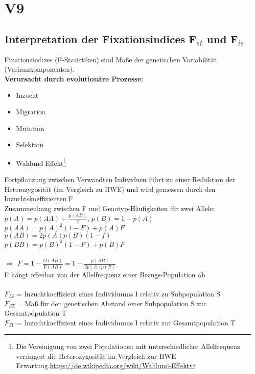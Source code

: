 \section{V9}
\subsection{Interpretation der Fixationsindices F$_{st}$ und F$_{is}$}
Fixationsindizes (F-Statistiken) sind Maße der genetischen Variabilität (Varianzkomponenten).\\

\textbf{Verursacht durch evolutionäre Prozesse:}
\begin{itemize}
	\item Inzucht
	\item Migration
	\item Mutation
	\item Selektion
	\item Wahlund Effekt\footnote{Die Vereinigung von zwei Populationen mit unterschiedlicher Allelfrequenz verringert die Heterozygosität im Vergleich zur HWE Erwartung.\url{https://de.wikipedia.org/wiki/Wahlund-Effekt}}
\end{itemize}

Fortpflanzung zwischen Verwandten Individuen führt zu einer Reduktion der Heterozygosität (im Vergleich zu HWE) und wird gemessen durch den Inzuchtskoeffizienten F\\
Zusammenhang zwischen F und Genotyp-Häufigkeiten für zwei Allele:\\
$p(A)=p(AA) + \frac{p(AB)}{2}$, $p(B)=1-p(A)$\\
$p(AA)=p(A)^2(1-F) + p(A)F$\\
$p(AB)=2p(A)p(B)(1-f)$\\
$p(BB)=p(B)^2(1-F) + p(B)F$\\\\
$\Rightarrow$ $\displaystyle F=1-\frac{O(AB)}{E(AB)}=1-\frac{p(AB)}{2p(A)p(B)}$\\
F hängt offenbar von der Allelfrequenz einer Bezugs-Population ab
\\\\
$F_{IS}$ = Inzuchtkoeffizient eines Individuums I relativ zu Subpopulation S\\
$F_{ST}$ = Maß für den genetischen Abstand einer Subpopulation S zur Gesamtpopulation T\\
$F_{IT}$ = Inzuchtkoeffizient eines Individuums I relativ zur Gesamtpopulation T

